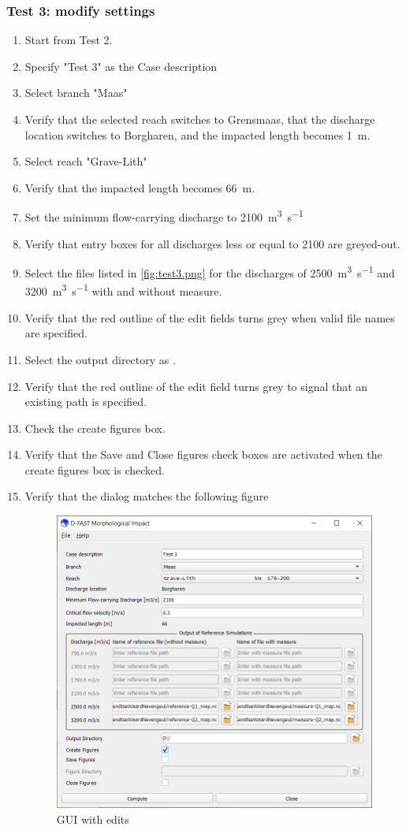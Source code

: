 \subsubsection{Test 3: modify settings}
\begin{enumerate}
\item Start from Test 2.
\item Specify "Test 3" as the Case description
\item Select branch "Maas"
\item Verify that the selected reach switches to Grensmaas, that the discharge location switches to Borgharen, and the impacted length becomes \SI{1}{\metre}.
\item Select reach "Grave-Lith"
\item Verify that the impacted length becomes \SI{66}{\metre}.
\item Set the minimum flow-carrying discharge to \SI{2100}{\metre\cubed\per\second}
\item Verify that entry boxes for all discharges less or equal to 2100 are greyed-out.
\item Select the files listed in \autoref{fig:test3.png} for the discharges of \SI{2500}{\metre\cubed\per\second} and \SI{3200}{\metre\cubed\per\second} with and without measure.
\item Verify that the red outline of the edit fields turns grey when valid file names are specified.
\item Select the output directory as .
\item Verify that the red outline of the edit field turns grey to signal that an existing path is specified.
\item Check the create figures box.
\item Verify that the Save and Close figures check boxes are activated when the create figures box is checked.
\item Verify that the dialog matches the following figure
\begin{figure}[H]
\center
\includegraphics[width=12cm]{figures/test3.png}
\caption{GUI with edits}
\label{fig:test3.png}
\end{figure}
\end{enumerate}

